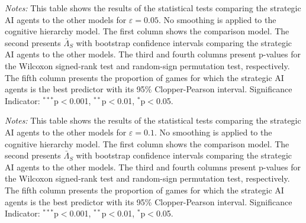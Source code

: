 \documentclass[11pt]{article}
\theoremstyle{definition}
\newcommand{\starlanguage}{Significance Indicator: $^{***}$p$<$0.001, $^{**}$p$<$0.01, $^{*}$p$<$0.05.}
\newcommand{\aisub}{AI agent}
\begin{document}
\begin{table}[h!]
\begin{center}
\caption{Statistical tests comparing strategic \aisub{s} vs other models ($\varepsilon = 0.05$)} \label{tab:stat_bounds_05}
\scriptsize

\end{center}
\begin{footnotesize}
\begin{singlespace}
\vspace*{-0.05in}
\emph{Notes:} This table shows the results of the statistical tests comparing the strategic \aisub{s} to the other models for $\varepsilon = 0.05$.
No smoothing is applied to the cognitive hierarchy model.
The first column shows the comparison model.
The second presents $\bar \Lambda_S$ with bootstrap confidence intervals comparing the strategic \aisub{s} to the other models.
The third and fourth columns present p-values for the Wilcoxon signed-rank test and random-sign permutation test, respectively.
The fifth column presents the proportion of games for which the strategic \aisub{s} is the best predictor with its 95\% Clopper-Pearson interval. \starlanguage
\end{singlespace}
\end{footnotesize}
\end{table}

\begin{table}[h!]
\begin{center}
\caption{Statistical tests comparing optimized vs other models ($\varepsilon = 0.1$)} \label{tab:stat_bounds_10}
\scriptsize

\end{center}
\begin{footnotesize}
\begin{singlespace}
\vspace*{-0.05in}
\emph{Notes:} This table shows the results of the statistical tests comparing the strategic \aisub{s} to the other models for $\varepsilon = 0.1$.
No smoothing is applied to the cognitive hierarchy model.
The first column shows the comparison model.
The second presents $\bar \Lambda_S$ with bootstrap confidence intervals comparing the strategic \aisub{s} to the other models.
The third and fourth columns present p-values for the Wilcoxon signed-rank test and random-sign permutation test, respectively.
The fifth column presents the proportion of games for which the strategic \aisub{s} is the best predictor with its 95\% Clopper-Pearson interval. \starlanguage
\end{singlespace}
\end{footnotesize}
\end{table}
\end{document}
